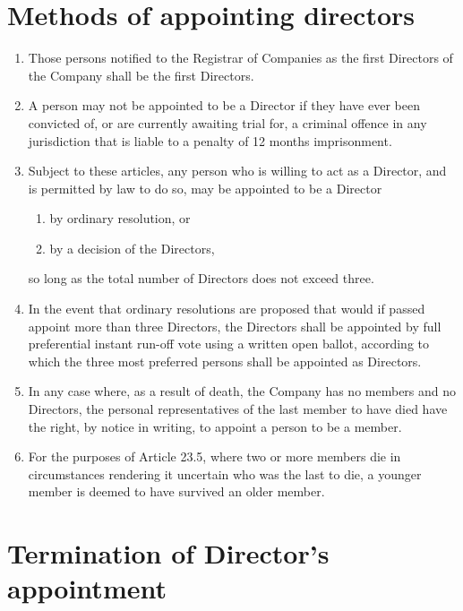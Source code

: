 \documentclass[a4paper,12pt]{article}
\renewcommand{\labelenumii}{(\alph{enumii})}
\begin{document}
\section{Methods of appointing directors}

\begin{enumerate}
  \item Those persons notified to the Registrar of Companies as the first Directors of the Company shall be the first Directors.
  \item A person may not be appointed to be a Director if they have ever been convicted of, or are currently awaiting trial for, a criminal offence in any jurisdiction that is liable to a penalty of 12 months imprisonment. %
  \item Subject to these articles, any person who is willing to act as a Director, and is permitted by law to do so, may be appointed to be a Director
  \begin{enumerate}
    \renewcommand{\labelenumii}{(\alph{enumii})}
    \item by ordinary resolution, or
    \item by a decision of the Directors,
  \end{enumerate}
  so long as the total number of Directors does not exceed three. %
  \item In the event that ordinary resolutions are proposed that would if passed appoint more than three Directors, the Directors shall be appointed by full preferential instant run-off vote using a written open ballot, according to which the three most preferred persons shall be appointed as Directors. %
  \item In any case where, as a result of death, the Company has no members and no Directors, the personal representatives of the last member to have died have the right, by notice in writing, to appoint a person to be a member.
  \item For the purposes of Article 23.5, where two or more members die in circumstances rendering it uncertain who was the last to die, a younger member is deemed to have survived an older member.
\end{enumerate}

\section{Termination of Director's appointment}
\end{document}
